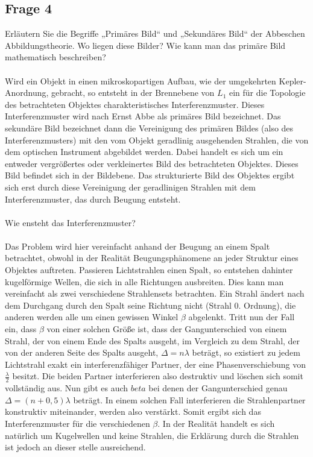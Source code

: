 \documentclass[a4paper,10pt]{scrartcl}
\begin{document}
		\subsection{Frage 4}
			Erläutern Sie die Begriffe „Primäres Bild“ und „Sekundäres Bild“ der Abbeschen Abbildungstheorie.
			Wo liegen diese Bilder? Wie kann man das primäre Bild mathematisch beschreiben?\\
			\\
			Wird ein Objekt in einen mikroskopartigen Aufbau, wie der umgekehrten Kepler-Anordnung, gebracht, so entsteht in der Brennebene von \(L_{1}\) ein für die Topologie des betrachteten Objektes charakteristisches Interferenzmuster. Dieses Interferenzmuster wird nach Ernst Abbe als primäres Bild bezeichnet. Das sekundäre Bild bezeichnet dann die Vereinigung des primären Bildes (also des Interferenzmusters) mit den vom Objekt geradlinig ausgehenden Strahlen, die von dem optischen Instrument abgebildet werden. Dabei handelt es sich um ein entweder vergrößertes oder verkleinertes Bild des betrachteten Objektes. Dieses Bild befindet sich in der Bildebene. Das strukturierte Bild des Objektes ergibt sich erst durch diese Vereinigung der geradlinigen Strahlen mit dem Interferenzmuster, das durch Beugung entsteht.\\
			\\
			Wie ensteht das Interferenzmuster?\\
			\\
			Das Problem wird hier vereinfacht anhand der Beugung an einem Spalt betrachtet, obwohl in der Realität Beugungsphänomene an jeder Struktur eines Objektes auftreten. Passieren Lichtstrahlen einen Spalt, so entstehen dahinter kugelförmige Wellen, die sich in alle Richtungen ausbreiten. Dies kann man vereinfacht als zwei verschiedene Strahlensets betrachten. Ein Strahl ändert nach dem Durchgang durch den Spalt seine Richtung nicht (Strahl 0. Ordnung), die anderen werden alle um einen gewissen Winkel \(\beta\) abgelenkt. Tritt nun der Fall ein, dass \(\beta\) von einer solchen Größe ist, dass der Gangunterschied von einem Strahl, der von einem Ende des Spalts ausgeht, im Vergleich zu dem Strahl, der von der anderen Seite des Spalts ausgeht, \(\Delta=n\lambda\) beträgt, so existiert zu jedem Lichtstrahl exakt ein interferenzfähiger Partner, der eine Phasenverschiebung von \(\frac{\lambda}{2}\) besitzt. Die beiden Partner interferieren also destruktiv und löschen sich somit vollständig aus. Nun gibt es auch \(beta\) bei denen der Gangunterschied genau \(\Delta=(n+0,5)\lambda\) beträgt. In einem solchen Fall interferieren die Strahlenpartner konstruktiv miteinander, werden also verstärkt. Somit ergibt sich das Interferenzmuster für die verschiedenen \(\beta\). In der Realität handelt es sich natürlich um Kugelwellen und keine Strahlen, die Erklärung durch die Strahlen ist jedoch an dieser stelle ausreichend.\\
\end{document}
